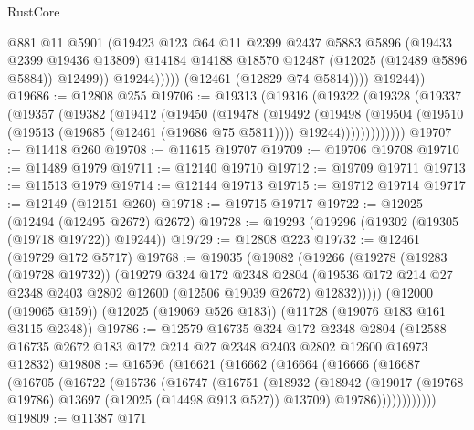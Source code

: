 \begin{lexlean}{RustCore}
\begin{coremodule}
                        @881
                        @11
                        @5901
                        (@19423
                          @123
                          @64
                          @11
                          @2399
                          @2437
                          @5883
                          @5896
                          (@19433 @2399 @19436 @13809)
                          @14184
                          @14188
                          @18570
                          @12487
                          (@12025 (@12489 @5896 @5884))
                          @12499))
                      @19244)))))
            (@12461 (@12829 @74 @5814))))
        @19244))
@19686 := @12808 @255
@19706 := @19313
    (@19316
      (@19322
        (@19328
          (@19337
            (@19357
              (@19382
                (@19412
                  (@19450
                    (@19478
                      (@19492
                        (@19498
                          (@19504
                            (@19510
                              (@19513 (@19685 (@12461 (@19686 @75 @5811))))
                              @19244)))))))))))))
@19707 := @11418 @260
@19708 := @11615 @19707
@19709 := @19706 @19708
@19710 := @11489 @1979
@19711 := @12140 @19710
@19712 := @19709 @19711
@19713 := @11513 @1979
@19714 := @12144 @19713
@19715 := @19712 @19714
@19717 := @12149 (@12151 @260)
@19718 := @19715 @19717
@19722 := @12025 (@12494 (@12495 @2672) @2672)
@19728 := @19293 (@19296 (@19302 (@19305 (@19718 @19722)) @19244))
@19729 := @12808 @223
@19732 := @12461 (@19729 @172 @5717)
@19768 := @19035
    (@19082
      (@19266
        (@19278
          (@19283 (@19728 @19732))
          (@19279
            @324
            @172
            @2348
            @2804
            (@19536 @172 @214 @27 @2348 @2403 @2802 @12600 (@12506 @19039 @2672) @12832)))))
    (@12000 (@19065 @159))
    (@12025 (@19069 @526 @183))
    (@11728 (@19076 @183 @161 @3115 @2348))
@19786 := @12579
    @16735
    @324
    @172
    @2348
    @2804
    (@12588 @16735 @2672 @183 @172 @214 @27 @2348 @2403 @2802 @12600 @16973 @12832)
@19808 := @16596
    (@16621
      (@16662
        (@16664
          (@16666
            (@16687
              (@16705
                (@16722
                  (@16736
                    (@16747
                      (@16751
                        (@18932
                          (@18942
                            (@19017 (@19768 @19786) @13697 (@12025 (@14498 @913 @527)) @13709)
                            @19786))))))))))))
@19809 := @11387 @171

\end{coremodule}
\end{lexlean}
